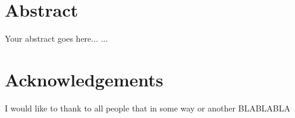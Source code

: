 \documentclass{book}
\begin{document}



%

\chapter*{Abstract}
%
Your abstract goes here...
...


\chapter*{Acknowledgements}%
%

I would like to thank to all people that in some way or another BLABLABLA


\tableofcontents
\setcounter{tocdepth}{3}

\listoffigures

\listoftables














%
\end{document}
